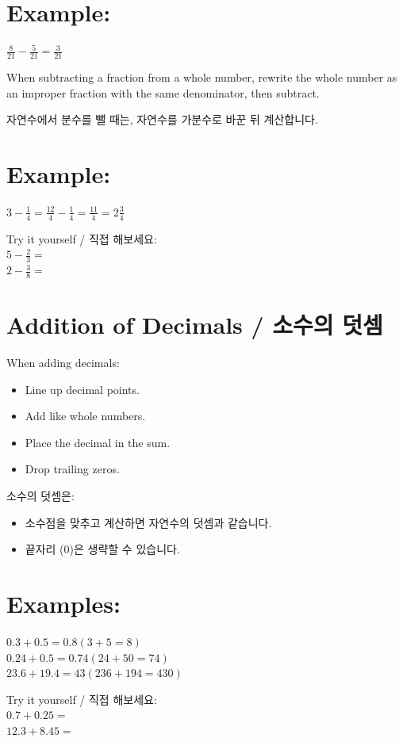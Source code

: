 \documentclass[10pt]{article}
\begin{document}
\section*{Example:}
$\frac{8}{21}-\frac{5}{21}=\frac{3}{21}$

When subtracting a fraction from a whole number, rewrite the whole number as an improper fraction with the same denominator, then subtract.

자연수에서 분수를 뺄 때는, 자연수를 가분수로 바꾼 뒤 계산합니다.

\section*{Example:}
$3-\frac{1}{4}=\frac{12}{4}-\frac{1}{4}=\frac{11}{4}=2 \frac{3}{4}$

Try it yourself / 직접 해보세요:\\
$5-\frac{2}{3}=$\\
$2-\frac{3}{8}=$

\section*{Addition of Decimals / 소수의 덧셈}
When adding decimals:

\begin{itemize}
  \item Line up decimal points.
  \item Add like whole numbers.
  \item Place the decimal in the sum.
  \item Drop trailing zeros.
\end{itemize}

소수의 덧셈은:

\begin{itemize}
  \item 소수점을 맞추고 계산하면 자연수의 덧셈과 같습니다.
  \item 끝자리 (0)은 생략할 수 있습니다.
\end{itemize}

\section*{Examples:}
$0.3+0.5=0.8(3+5=8)$\\
$0.24+0.5=0.74(24+50=74)$\\
$23.6+19.4=43(236+194=430)$

Try it yourself / 직접 해보세요:\\
$0.7+0.25=$\\
$12.3+8.45=$
\end{document}
